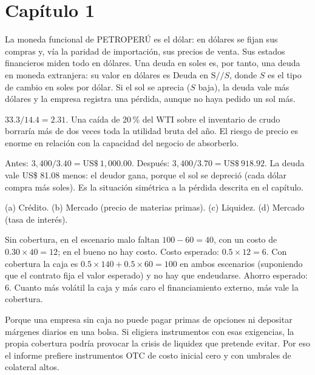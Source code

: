 \section*{Capítulo 1}

 La moneda funcional de PETROPERÚ es el dólar: en dólares se fijan sus compras y, vía la paridad de importación, sus precios de venta. Sus estados financieros miden todo en dólares. Una deuda en soles es, por tanto, una deuda en moneda extranjera: su valor en dólares es $\text{Deuda en S/}/S$, donde $S$ es el tipo de cambio en soles por dólar. Si el sol se aprecia ($S$ baja), la deuda vale más dólares y la empresa registra una pérdida, aunque no haya pedido un sol más.

 $33.3/14.4=2.31$. Una caída de 20\,\% del WTI sobre el inventario de crudo borraría más de dos veces toda la utilidad bruta del año. El riesgo de precio es enorme en relación con la capacidad del negocio de absorberlo.

 Antes: $3{,}400/3.40=\text{US\$}~1{,}000.00$. Después: $3{,}400/3.70=\text{US\$}~918.92$. La deuda vale US\$ 81.08 menos: el deudor gana, porque el sol se depreció (cada dólar compra más soles). Es la situación simétrica a la pérdida descrita en el capítulo.

 (a) Crédito. (b) Mercado (precio de materias primas). (c) Liquidez. (d) Mercado (tasa de interés).

 Sin cobertura, en el escenario malo faltan $100-60=40$, con un costo de $0.30\times40=12$; en el bueno no hay costo. Costo esperado: $0.5\times12=6$. Con cobertura la caja es $0.5\times140+0.5\times60=100$ en ambos escenarios (suponiendo que el contrato fija el valor esperado) y no hay que endeudarse. Ahorro esperado: 6. Cuanto más volátil la caja y más caro el financiamiento externo, más vale la cobertura.

 Porque una empresa sin caja no puede pagar primas de opciones ni depositar márgenes diarios en una bolsa. Si eligiera instrumentos con esas exigencias, la propia cobertura podría provocar la crisis de liquidez que pretende evitar. Por eso el informe prefiere instrumentos OTC de costo inicial cero y con umbrales de colateral altos.
